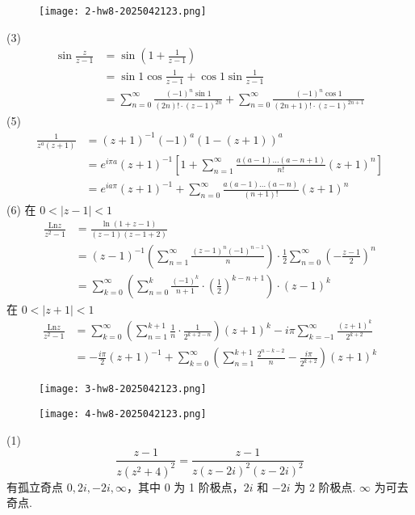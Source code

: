 \begin{exercise}
\begin{figure}[H]
\centering
\texttt{[image: 2-hw8-2025042123.png]}
\label{}
\end{figure}
\end{exercise}
(3)
\[
\begin{aligned}
\sin\frac{z}{z-1} & =\sin\left( 1+\frac{1}{z-1} \right) \\
 & =\sin1\cos\frac{1}{z-1}+\cos1\sin\frac{1}{z-1} \\
 & =\sum_{n=0}^{\infty} \frac{(-1)^{n}\sin1}{(2n)!\cdot(z-1)^{2n}}+\sum_{n=0}^{\infty} \frac{(-1)^{n}\cos1}{(2n+1)!\cdot(z-1)^{2n+1}}
\end{aligned}
\]
(5)
\[
\begin{aligned}
\frac{1}{z^{a}(z+1)} & =(z+1)^{-1}(-1)^{a}(1-(z+1))^{a} \\
 & =e^{ i \pi a }(z+1)^{-1} \left[ 1+\sum_{n=1}^{\infty} \frac{a(a-1)\dots(a-n+1)}{n!}(z+1)^{n} \right] \\
 & =e^{ i a \pi }(z+1)^{-1}+\sum_{n=0}^{\infty} \frac{a(a-1)\dots(a-n)}{(n+1)!}(z+1)^{n}
\end{aligned}
\]
(6) 在 $0<\lvert z-1 \rvert<1$
\[
\begin{aligned}
\frac{\mathrm{Ln}z}{z^2-1} & =\frac{\ln(1+z-1)}{(z-1)(z-1+2)} \\
 & =(z-1)^{-1} \left( \sum_{n=1}^{\infty} \frac{(z-1)^{n}(-1)^{n-1}}{n} \right)\cdot\frac{1}{2}\sum_{n=0}^{\infty} \left( -\frac{z-1}{2} \right)^{n } \\
 & =\sum_{k=0}^{\infty} \left( \sum_{n=0}^{k} \frac{(-1)^{k}}{n+1}\cdot\left( \frac{1}{2} \right)^{k-n+1} \right)\cdot(z-1)^{k} 
\end{aligned}
\]
在 $0<\lvert z+1 \rvert<1$
\[
\begin{aligned}
\frac{\mathrm{Ln}z}{z^2-1} & =\sum_{k=0}^{\infty} \left( \sum_{n=1}^{k+1} \frac{1}{n}\cdot\frac{1}{2^{k+2-n}} \right)(z+1)^{k}-i\pi\sum_{k=-1}^{\infty}\frac{(z+1)^{k}}{2^{k+2}}  \\
 & =-\frac{i\pi}{2}(z+1)^{-1}+\sum_{k=0}^{\infty}\left( \sum_{n=1}^{k+1} \frac{2^{n-k-2}}{n}-\frac{i\pi}{2^{k+2}} \right)(z+1 )^{k} 
\end{aligned}
\]
\begin{exercise}
\begin{figure}[H]
\centering
\texttt{[image: 3-hw8-2025042123.png]}
\label{}
\end{figure}
\begin{figure}[H]
\centering
\texttt{[image: 4-hw8-2025042123.png]}
\label{}
\end{figure}
\end{exercise}
(1)
\[
\frac{z-1}{z(z^2+4)^2}=\frac{z-1}{z(z-2i)^{2}(z-2i)^2}
\]
有孤立奇点 $0,2i,-2i,\infty$，其中 $0$ 为 1 阶极点，$2i$ 和 $-2i$ 为 2 阶极点. $\infty$ 为可去奇点.

